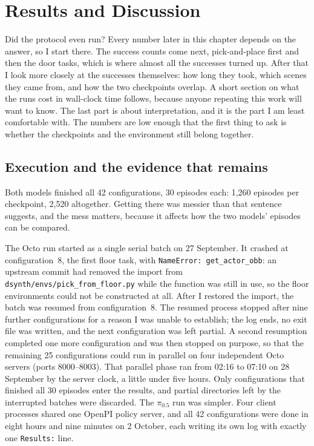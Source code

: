 \chapter{Results and Discussion}
\label{chap:results}
\begingroup
\justifying
\setlength{\parindent}{2em}
\setlength{\parskip}{0.55\baselineskip}

Did the protocol even run? Every number later in this chapter depends on the answer, so I start there. The success counts come next, pick-and-place first and then the door tasks, which is where almost all the successes turned up. After that I look more closely at the successes themselves: how long they took, which scenes they came from, and how the two checkpoints overlap. A short section on what the runs cost in wall-clock time follows, because anyone repeating this work will want to know. The last part is about interpretation, and it is the part I am least comfortable with. The numbers are low enough that the first thing to ask is whether the checkpoints and the environment still belong together.

\section{Execution and the evidence that remains}
\label{sec:execution}

Both models finished all 42 configurations, 30 episodes each: 1,260 episodes per checkpoint, 2,520 altogether. Getting there was messier than that sentence suggests, and the mess matters, because it affects how the two models' episodes can be compared.

The Octo run started as a single serial batch on 27 September. It crashed at configuration~8, the first floor task, with \texttt{NameError: get\_actor\_obb}: an upstream commit had removed the import from \texttt{dsynth/envs/pick\_from\_floor.py} while the function was still in use, so the floor environments could not be constructed at all. After I restored the import, the batch was resumed from configuration~8. The resumed process stopped after nine further configurations for a reason I was unable to establish; the log ends, no exit file was written, and the next configuration was left partial. A second resumption completed one more configuration and was then stopped on purpose, so that the remaining 25 configurations could run in parallel on four independent Octo servers (ports 8000--8003). That parallel phase ran from 02:16 to 07:10 on 28 September by the server clock, a little under five hours. Only configurations that finished all 30 episodes enter the results, and partial directories left by the interrupted batches were discarded. The $\pi_{0.5}$ run was simpler. Four client processes shared one OpenPI policy server, and all 42 configurations were done in eight hours and nine minutes on 2 October, each writing its own log with exactly one \texttt{Results:} line.

